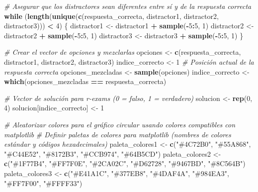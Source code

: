 \documentclass[
]{article}
\newenvironment{Shaded}{\begin{snugshade}}{\end{snugshade}}
\newcommand{\CommentTok}[1]{\textcolor[rgb]{0.56,0.35,0.01}{\textit{#1}}}
\newcommand{\ControlFlowTok}[1]{\textcolor[rgb]{0.13,0.29,0.53}{\textbf{#1}}}
\newcommand{\DecValTok}[1]{\textcolor[rgb]{0.00,0.00,0.81}{#1}}
\newcommand{\FunctionTok}[1]{\textcolor[rgb]{0.13,0.29,0.53}{\textbf{#1}}}
\newcommand{\NormalTok}[1]{#1}
\newcommand{\OtherTok}[1]{\textcolor[rgb]{0.56,0.35,0.01}{#1}}
\newcommand{\SpecialCharTok}[1]{\textcolor[rgb]{0.81,0.36,0.00}{\textbf{#1}}}
\newcommand{\StringTok}[1]{\textcolor[rgb]{0.31,0.60,0.02}{#1}}
\begin{document}
\begin{Shaded}
\begin{Highlighting}[]
\CommentTok{\# Asegurar que los distractores sean diferentes entre sí y de la respuesta correcta}
\ControlFlowTok{while}\NormalTok{ (}\FunctionTok{length}\NormalTok{(}\FunctionTok{unique}\NormalTok{(}\FunctionTok{c}\NormalTok{(respuesta\_correcta, distractor1, distractor2, distractor3))) }\SpecialCharTok{\textless{}} \DecValTok{4}\NormalTok{) \{}
\NormalTok{  distractor1 }\OtherTok{\textless{}{-}}\NormalTok{ distractor1 }\SpecialCharTok{+} \FunctionTok{sample}\NormalTok{(}\SpecialCharTok{{-}}\DecValTok{5}\SpecialCharTok{:}\DecValTok{5}\NormalTok{, }\DecValTok{1}\NormalTok{)}
\NormalTok{  distractor2 }\OtherTok{\textless{}{-}}\NormalTok{ distractor2 }\SpecialCharTok{+} \FunctionTok{sample}\NormalTok{(}\SpecialCharTok{{-}}\DecValTok{5}\SpecialCharTok{:}\DecValTok{5}\NormalTok{, }\DecValTok{1}\NormalTok{)}
\NormalTok{  distractor3 }\OtherTok{\textless{}{-}}\NormalTok{ distractor3 }\SpecialCharTok{+} \FunctionTok{sample}\NormalTok{(}\SpecialCharTok{{-}}\DecValTok{5}\SpecialCharTok{:}\DecValTok{5}\NormalTok{, }\DecValTok{1}\NormalTok{)}
\NormalTok{\}}

\CommentTok{\# Crear el vector de opciones y mezclarlas}
\NormalTok{opciones }\OtherTok{\textless{}{-}} \FunctionTok{c}\NormalTok{(respuesta\_correcta, distractor1, distractor2, distractor3)}
\NormalTok{indice\_correcto }\OtherTok{\textless{}{-}} \DecValTok{1}  \CommentTok{\# Posición actual de la respuesta correcta}
\NormalTok{opciones\_mezcladas }\OtherTok{\textless{}{-}} \FunctionTok{sample}\NormalTok{(opciones)}
\NormalTok{indice\_correcto }\OtherTok{\textless{}{-}} \FunctionTok{which}\NormalTok{(opciones\_mezcladas }\SpecialCharTok{==}\NormalTok{ respuesta\_correcta)}

\CommentTok{\# Vector de solución para r{-}exams (0 = falso, 1 = verdadero)}
\NormalTok{solucion }\OtherTok{\textless{}{-}} \FunctionTok{rep}\NormalTok{(}\DecValTok{0}\NormalTok{, }\DecValTok{4}\NormalTok{)}
\NormalTok{solucion[indice\_correcto] }\OtherTok{\textless{}{-}} \DecValTok{1}

\CommentTok{\# Aleatorizar colores para el gráfico circular usando colores compatibles con matplotlib}
\CommentTok{\# Definir paletas de colores para matplotlib (nombres de colores estándar y códigos hexadecimales)}
\NormalTok{paleta\_colores1 }\OtherTok{\textless{}{-}} \FunctionTok{c}\NormalTok{(}\StringTok{"\#4C72B0"}\NormalTok{, }\StringTok{"\#55A868"}\NormalTok{, }\StringTok{"\#C44E52"}\NormalTok{, }\StringTok{"\#8172B3"}\NormalTok{, }\StringTok{"\#CCB974"}\NormalTok{, }\StringTok{"\#64B5CD"}\NormalTok{)}
\NormalTok{paleta\_colores2 }\OtherTok{\textless{}{-}} \FunctionTok{c}\NormalTok{(}\StringTok{"\#1F77B4"}\NormalTok{, }\StringTok{"\#FF7F0E"}\NormalTok{, }\StringTok{"\#2CA02C"}\NormalTok{, }\StringTok{"\#D62728"}\NormalTok{, }\StringTok{"\#9467BD"}\NormalTok{, }\StringTok{"\#8C564B"}\NormalTok{)}
\NormalTok{paleta\_colores3 }\OtherTok{\textless{}{-}} \FunctionTok{c}\NormalTok{(}\StringTok{"\#E41A1C"}\NormalTok{, }\StringTok{"\#377EB8"}\NormalTok{, }\StringTok{"\#4DAF4A"}\NormalTok{, }\StringTok{"\#984EA3"}\NormalTok{, }\StringTok{"\#FF7F00"}\NormalTok{, }\StringTok{"\#FFFF33"}\NormalTok{)}


\end{Highlighting}
\end{Shaded}
\end{document}
